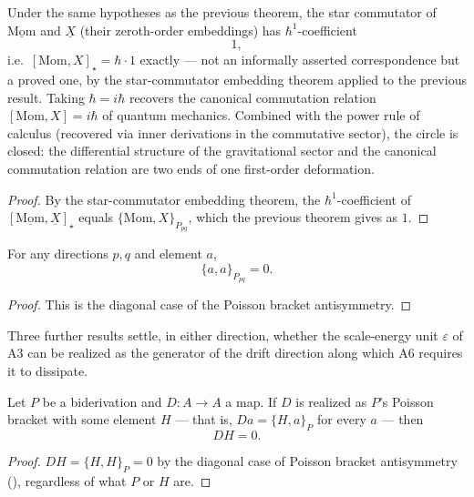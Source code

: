 \begin{theorem}
Under the same hypotheses as the previous theorem, the star commutator of $\underline{\text{Mom}}$ and $\underline{X}$ (their zeroth-order embeddings) has $\hbar^1$-coefficient
\[
1 ,
\]
i.e.\ $[\text{Mom}, X]_\star = \hbar \cdot 1$ exactly — not an informally asserted correspondence but a proved one, by the star-commutator embedding theorem applied to the previous result. Taking $\hbar = i\hbar$ recovers the canonical commutation relation $[\text{Mom}, X] = i\hbar$ of quantum mechanics. Combined with the power rule of calculus (recovered via inner derivations in the commutative sector), the circle is closed: the differential structure of the gravitational sector and the canonical commutation relation are two ends of one first-order deformation.
\begin{proof}
By the star-commutator embedding theorem, the $\hbar^1$-coefficient of $[\underline{\text{Mom}},\underline{X}]_\star$ equals $\{\text{Mom},X\}_{P_{pq}}$, which the previous theorem gives as $1$.
\end{proof}
\end{theorem}

\begin{theorem}
For any directions $p, q$ and element $a$,
\[
\{a, a\}_{P_{pq}} = 0 .
\]
\begin{proof}
This is the diagonal case of the Poisson bracket antisymmetry.
\end{proof}
\end{theorem}

Three further results settle, in either direction, whether the scale-energy unit $\varepsilon$ of A3 can be realized as the generator of the drift direction along which A6 requires it to dissipate.

\begin{theorem}
Let $P$ be a biderivation and $D: A \to A$ a map. If $D$ is realized as $P$'s Poisson bracket with some element $H$ — that is, $Da = \{H, a\}_P$ for every $a$ — then
\[
DH = 0 .
\]
\begin{proof}
$DH = \{H, H\}_P = 0$ by the diagonal case of Poisson bracket antisymmetry (), regardless of what $P$ or $H$ are.
\end{proof}
\end{theorem}


